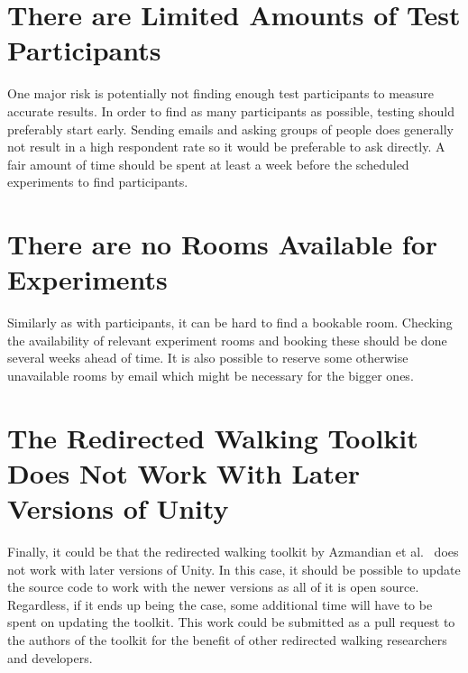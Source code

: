 \section{There are Limited Amounts of Test Participants}
One major risk is potentially not finding enough test participants to measure accurate results. In order to find as many participants as possible, testing should preferably start early. Sending emails and asking groups of people does generally not result in a high respondent rate so it would be preferable to ask directly. A fair amount of time should be spent at least a week before the scheduled experiments to find participants. 

\section{There are no Rooms Available for Experiments}
Similarly as with participants, it can be hard to find a bookable room. Checking the availability of relevant experiment rooms and booking these should be done several weeks ahead of time. It is also possible to reserve some otherwise unavailable rooms by email which might be necessary for the bigger ones. 

\section{The Redirected Walking Toolkit Does Not Work With Later Versions of Unity}
Finally, it could be that the redirected walking toolkit by Azmandian et al.~\cite{azmandian2016redirected} does not work with later versions of Unity. In this case, it should be possible to update the source code to work with the newer versions as all of it is open source. Regardless, if it ends up being the case, some additional time will have to be spent on updating the toolkit. This work could be submitted as a pull request to the authors of the toolkit for the benefit of other redirected walking researchers and developers.  
